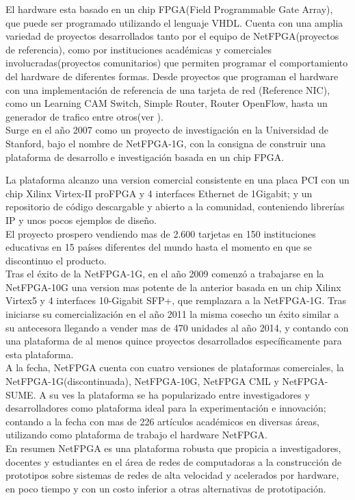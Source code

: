 El hardware esta basado en un chip FPGA(Field Programmable Gate Array), que puede ser programado  utilizando el lenguaje VHDL. Cuenta con una amplia variedad de proyectos desarrollados tanto por el equipo de NetFPGA(proyectos de referencia), como por instituciones académicas y comerciales involucradas(proyectos comunitarios) que permiten programar el comportamiento del hardware  de diferentes formas. Desde proyectos que programan el hardware con una implementación de referencia de una tarjeta de red (Reference NIC), como un Learning CAM Switch, Simple Router, Router OpenFlow, hasta un generador de trafico entre otros(ver \citep{NetFPGA2}).\\ 

Surge en el año 2007 como un proyecto de investigación en la Universidad de Stanford, bajo el nombre de NetFPGA-1G, con la consigna de construir una plataforma de desarrollo e investigación basada en un chip FPGA.
 
La plataforma alcanzo una version comercial consistente en una placa PCI con un chip Xilinx Virtex-II proFPGA y 4 interfaces Ethernet de 1Gigabit; y un repositorio de código descargable y abierto a la comunidad, conteniendo librerías IP y unos pocos ejemplos de diseño.\\

El proyecto prospero vendiendo mas de 2.600 tarjetas en 150 instituciones educativas en 15 países diferentes del mundo hasta el momento en que se discontinuo el producto.\\

Tras el éxito de la NetFPGA-1G, en el año 2009 comenzó a trabajarse en la NetFPGA-10G una version mas potente de la  anterior basada en un chip Xilinx Virtex5 y 4 interfaces 10-Gigabit SFP+, que remplazara a la NetFPGA-1G. Tras iniciarse su comercialización en el año 2011 la misma cosecho un éxito similar a su antecesora llegando a vender mas de 470 unidades al año 2014, y contando con una plataforma de al menos quince proyectos desarrollados específicamente para esta plataforma.\\

A la fecha, NetFPGA cuenta con cuatro versiones de plataformas comerciales, la NetFPGA-1G(discontinuada), NetFPGA-10G, NetFPGA CML y NetFPGA-SUME. A su ves la plataforma se ha popularizado entre investigadores y desarrolladores como plataforma ideal para la experimentación e innovación; contando a la fecha con mas de 226 artículos académicos\cite{NetFPGA4} en diversas áreas, utilizando como plataforma de trabajo el hardware NetFPGA.\\

En resumen NetFPGA es una plataforma robusta que propicia a investigadores, docentes y estudiantes en el área de redes de computadoras a la construcción de prototipos sobre sistemas de redes de alta velocidad y acelerados por hardware, en poco tiempo y con un costo inferior a otras alternativas de prototipaci\'on.



